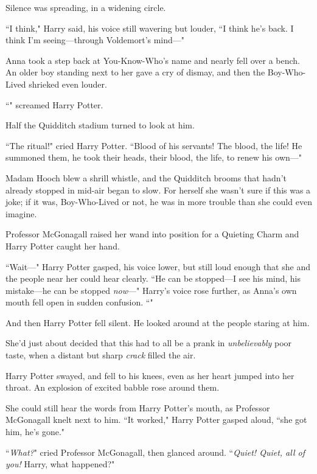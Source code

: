 Silence was spreading, in a widening circle.

``I think," Harry said, his voice still wavering but louder, ``I think he's back. I think I'm seeing—through Voldemort's mind—"

Anna took a step back at You-Know-Who's name and nearly fell over a bench. An older boy standing next to her gave a cry of dismay, and then the Boy-Who-Lived shrieked even louder.

``" screamed Harry Potter.

Half the Quidditch stadium turned to look at him.

``The ritual!" cried Harry Potter. ``Blood of his servants! The blood, the life! He summoned them, he took their heads, their blood, the life, to renew his own—"

Madam Hooch blew a shrill whistle, and the Quidditch brooms that hadn't already stopped in mid-air began to slow. For herself she wasn't sure if this was a joke; if it was, Boy-Who-Lived or not, he was in more trouble than she could even imagine.

Professor McGonagall raised her wand into position for a Quieting Charm and Harry Potter caught her hand.

``Wait—" Harry Potter gasped, his voice lower, but still loud enough that she and the people near her could hear clearly. ``He can be stopped—I see his mind, his mistake—he can be stopped \emph{now}—" Harry's voice rose further, as Anna's own mouth fell open in sudden confusion. ``"

And then Harry Potter fell silent. He looked around at the people staring at him.

She'd just about decided that this had to all be a prank in \emph{unbelievably} poor taste, when a distant but sharp \emph{crack} filled the air.

Harry Potter swayed, and fell to his knees, even as her heart jumped into her throat. An explosion of excited babble rose around them.

She could still hear the words from Harry Potter's mouth, as Professor McGonagall knelt next to him. ``It worked," Harry Potter gasped aloud, ``she got him, he's gone."

``\emph{What?}" cried Professor McGonagall, then glanced around. ``\emph{Quiet! Quiet, all of you!} Harry, what happened?"

